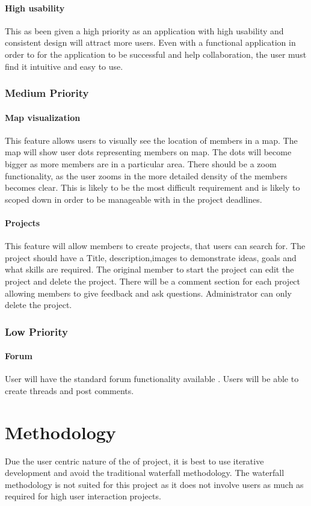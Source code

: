 \documentclass[a4paper,oneside,11pt]{report}
\begin{document}
\subsubsection{High usability} 
This as been given a high priority as an application with high usability and consistent design will attract more users. Even with a functional application in order to for the application to be successful and help collaboration, the user must find it intuitive and easy to use.
\subsection{Medium Priority}
\subsubsection{Map visualization}
This feature allows users to visually see the location of members in a map. The map will show user dots representing members on map. The dots will become bigger as more members are in a particular area. There should be a zoom functionality, as the user zooms in the more detailed density of the members becomes clear. This is likely to be the most difficult requirement and is likely to scoped down in order to be manageable with in the project deadlines.
\subsubsection{Projects}
This feature will allow members to create projects, that users can search for. The project should have a Title, description,images to demonstrate ideas, goals and what skills are required. The original member to start the project can edit the project and delete the project. There will be a comment section for each project allowing members to give feedback and ask questions. Administrator can only delete the project.
\subsection{Low Priority}
\subsubsection{Forum}
User will have the standard forum functionality available . Users will be able to create threads and post comments. 
\chapter{Methodology}
Due the user centric nature of the of project, it is best to use iterative development and avoid the traditional waterfall methodology. The waterfall methodology is not suited for this project as it does not involve users as much as required for high user interaction projects. 
\end{document}
